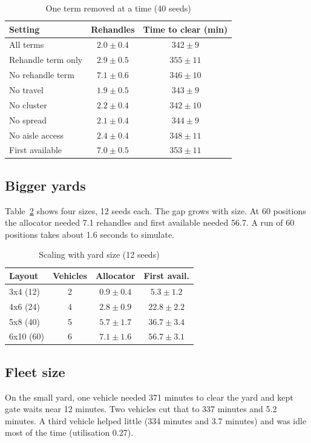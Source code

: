 \documentclass[conference]{IEEEtran}
\begin{document}
\begin{table}[t]
\caption{One term removed at a time (40 seeds)}
\label{tab:abl}
\centering
\small
\begin{tabular}{lcc}
\toprule
Setting & Rehandles & Time to clear (min) \\
\midrule
All terms & $2.0\pm0.4$ & $342\pm9$ \\
Rehandle term only & $2.9\pm0.5$ & $355\pm11$ \\
No rehandle term & $7.1\pm0.6$ & $346\pm10$ \\
No travel & $1.9\pm0.5$ & $343\pm9$ \\
No cluster & $2.2\pm0.4$ & $342\pm10$ \\
No spread & $2.1\pm0.4$ & $344\pm9$ \\
No aisle access & $2.4\pm0.4$ & $348\pm11$ \\
First available & $7.0\pm0.5$ & $353\pm11$ \\
\bottomrule
\end{tabular}
\end{table}

\subsection{Bigger yards}
Table~\ref{tab:scale} shows four sizes, 12 seeds each. The gap grows with size. At 60 positions the allocator needed 7.1 rehandles and first available needed 56.7. A run of 60 positions takes about 1.6 seconds to simulate.

\begin{table}[t]
\caption{Scaling with yard size (12 seeds)}
\label{tab:scale}
\centering
\small
\begin{tabular}{lccc}
\toprule
Layout & Vehicles & Allocator & First avail. \\
\midrule
3x4 (12) & 2 & $0.9\pm0.4$ & $5.3\pm1.2$ \\
4x6 (24) & 4 & $2.8\pm0.9$ & $22.8\pm2.2$ \\
5x8 (40) & 5 & $5.7\pm1.7$ & $36.7\pm3.4$ \\
6x10 (60) & 6 & $7.1\pm1.6$ & $56.7\pm3.1$ \\
\bottomrule
\end{tabular}
\end{table}

\subsection{Fleet size}
On the small yard, one vehicle needed 371 minutes to clear the yard and kept gate waits near 12 minutes. Two vehicles cut that to 337 minutes and 5.2 minutes. A third vehicle helped little (334 minutes and 3.7 minutes) and was idle most of the time (utilisation 0.27).
\end{document}
